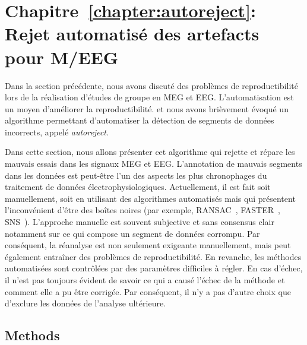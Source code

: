 \clearpage

\section*{Chapitre~\ref{chapter:autoreject}: Rejet automatisé des artefacts pour M/EEG}

Dans la section précédente, nous avons discuté des problèmes de reproductibilité lors de la réalisation d'études de groupe en MEG et EEG. L'automatisation est un moyen d'améliorer la reproductibilité. et nous avons brièvement évoqué un algorithme permettant d’automatiser la détection de segments de données incorrects, appelé \emph{autoreject}.

Dans cette section, nous allons présenter cet algorithme qui rejette et répare les mauvais essais dans les signaux MEG et EEG. L'annotation de mauvais segments dans les données est peut-être l'un des aspects les plus chronophages du traitement de données électrophysiologiques. Actuellement, il est fait soit manuellement, soit en utilisant des algorithmes automatisés mais qui présentent l’inconvénient d’être des boîtes noires (par exemple, RANSAC~\citep{bigdely2015prep}, FASTER~\citep{nolan2010faster}, SNS~\citep{de2008sensor}). L'approche manuelle est souvent subjective et sans consensus clair notamment sur ce qui compose un segment de données corrompu. Par conséquent, la réanalyse est non seulement exigeante manuellement, mais peut également entraîner des problèmes de reproductibilité. En revanche, les méthodes automatisées sont contrôlées par des paramètres difficiles à régler. En cas d'échec, il n'est pas toujours évident de savoir ce qui a causé l'échec de la méthode et comment elle a pu être corrigée. Par conséquent, il n’y a pas d'autre choix que d'exclure les données de l'analyse ultérieure.

\subsection*{Methods}

